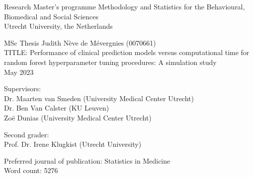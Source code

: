 \documentclass[14pt]{extarticle}
\begin{document}
\begin{titlepage}

\vspace*{\baselineskip}
Research Master’s programme Methodology and Statistics for the
Behavioural, Biomedical and Social Sciences \\
Utrecht University, the Netherlands

\vspace{4\baselineskip}

MSc Thesis Judith N\`{e}ve de M\'{e}vergnies (0070661) \\
TITLE: Performance of clinical prediction models versus computational
time for random forest hyperparameter tuning procedures: A
simulation study \\
May 2023 

\vspace{4\baselineskip}

Supervisors: \\
Dr. Maarten van Smeden (University Medical Center Utrecht) \\
Dr. Ben Van Calster (KU Leuven) \\
Zo\"{e} Dunias (University Medical Center Utrecht)

\vspace{2\baselineskip}

Second grader: \\
Prof. Dr. Irene Klugkist (Utrecht University) 

\vspace{4\baselineskip}

Preferred journal of publication: Statistics in Medicine \\
Word count: 5276

\end{titlepage}
\end{document}
